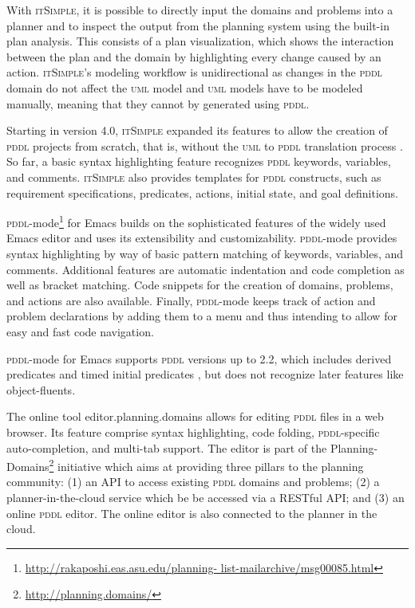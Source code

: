 \documentclass[runningheads]{llncs}
\newcommand{\epd}{editor.planning.domains\xspace}
\newcommand{\itsimple}{\textsc{itSimple}\xspace}
\newcommand{\pddlmode}{\textsc{pddl}-mode\xspace}
\newcommand{\pddl}{\textsc{pddl}\xspace}
\newcommand{\uml}{\textsc{uml}\xspace}
\begin{document}
With \itsimple, it is possible to directly input the domains and
problems into a planner and to inspect the output from the planning
system using the built-in plan analysis. This consists of a plan
visualization, which shows the interaction between the plan and the
domain by highlighting every change caused by an action. \itsimple's
modeling workflow is unidirectional as changes in the \pddl domain do
not affect the \uml model and \uml models have to be modeled manually,
meaning that they cannot by generated using \pddl.

Starting in version 4.0, \itsimple expanded its features to allow the
creation of \pddl projects from scratch, that is, without the \uml to
\pddl translation process \cite{vaquero2012itsimple4}. So far, a basic
syntax highlighting feature recognizes \pddl keywords, variables, and
comments. \itsimple also provides templates for \pddl constructs, such
as requirement specifications, predicates, actions, initial state, and
goal definitions.

\pddlmode\footnote{\url{http://rakaposhi.eas.asu.edu/planning-
    list-mailarchive/msg00085.html}} for Emacs builds on the
sophisticated features of the widely used Emacs editor and uses its
extensibility and customizability. \pddlmode provides syntax
highlighting by way of basic pattern matching of keywords, variables,
and comments. Additional features are automatic indentation and code
completion as well as bracket matching. Code snippets for the creation
of domains, problems, and actions are also available. Finally,
\textsc{pddl}-mode keeps track of action and problem declarations by
adding them to a menu and thus intending to allow for easy and fast
code navigation.

\pddlmode for Emacs supports \textsc{pddl} versions up to
2.2, which includes derived predicates and timed initial predicates
\cite{edelkamp2004pddl2}, but does not recognize later features like
object-fluents.

The online tool \epd allows for editing \pddl files in a web
browser. Its feature comprise syntax highlighting, code folding,
\pddl-specific auto-completion, and multi-tab support. The editor is
part of the Planning-Domains\footnote{\url{http://planning.domains/}}
initiative which aims at providing three pillars to the planning
community: (1) an API to access existing \pddl domains and problems;
(2) a planner-in-the-cloud service which be be accessed via a RESTful
API; and (3) an online \pddl editor. The online editor is also
connected to the planner in the cloud.
\end{document}
